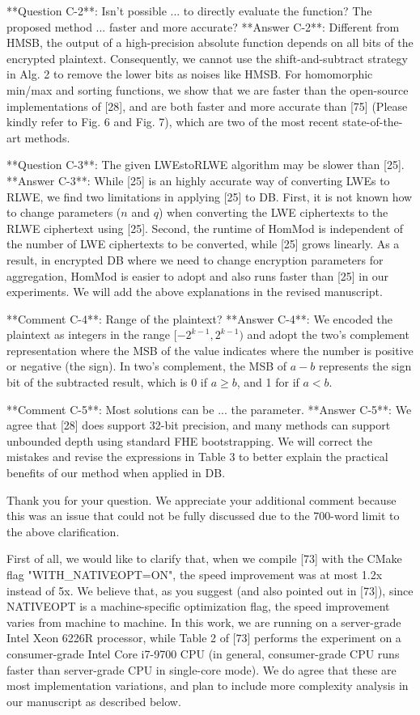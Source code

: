 **Question C-2**: Isn't possible ... to directly 
evaluate the function? The proposed method ... faster and more accurate?  
**Answer C-2**: 
Different from HMSB, the output of a high-precision absolute function 
depends on all bits of the encrypted plaintext.
Consequently, we cannot use the shift-and-subtract strategy in Alg. 2 
to remove the lower bits as noises like HMSB.
For homomorphic min/max and sorting functions, we show that we are faster
than the open-source implementations of [28], and are both faster
and more accurate than [75] (Please kindly refer to Fig. 6 and Fig. 7),
which are two of the most recent state-of-the-art methods.

**Question C-3**: The given LWEstoRLWE algorithm may be slower than
[25].  
**Answer C-3**: 
While [25] is an highly accurate way of converting LWEs to RLWE,
we find two limitations in applying [25] to DB.
First, it is not known how to change parameters ($n$ and $q$)
when converting the LWE ciphertexts to the RLWE ciphertext using [25].
Second, the runtime of HomMod is independent of the number of LWE ciphertexts
to be converted, while [25] grows linearly.
As a result, in encrypted DB where we need to change encryption parameters
for aggregation, HomMod is easier to adopt and also runs faster than [25] in 
our experiments.
We will add the above explanations in the revised manuscript.

**Comment C-4**: Range of the plaintext?  
**Answer C-4**: 
We encoded the plaintext as integers in the range $[-2^{k-1}, 2^{k-1})$ and 
adopt the two's complement representation where the MSB of the value indicates 
where the number is positive or negative (the sign).
In two's complement, the MSB of $a-b$ represents the sign bit of the 
subtracted result, which is 0 if $a\geq b$,
and 1 for if $a  <  b$. 

**Comment C-5**: Most solutions can be ... the parameter.   
**Answer C-5**: We agree that [28] does support 32-bit precision, and
many methods can support unbounded depth using standard FHE bootstrapping. 
We will correct the mistakes and revise the expressions
in Table 3 to better explain the practical benefits of our method 
when applied in DB.



Thank you for your question. We appreciate your 
additional comment because this was an issue that 
could not be fully discussed due to the 700-word limit
to the above clarification. 

First of all, we would like to clarify that, when we
compile [73] with the CMake flag "WITH_NATIVEOPT=ON", the speed improvement 
was at most 1.2x instead of 5x. 
We believe that, as you suggest (and also pointed out
in [73]), since NATIVEOPT is a machine-specific 
optimization flag, the speed improvement varies from
machine to machine.
In this work, we are running on a server-grade Intel Xeon 6226R
processor, while Table 2 of [73] performs the experiment on a 
consumer-grade Intel Core i7-9700 CPU (in general,
consumer-grade CPU runs faster than server-grade CPU in
single-core mode). We do agree that these are most
implementation variations, and plan to include more complexity
analysis in our manuscript as described below.


